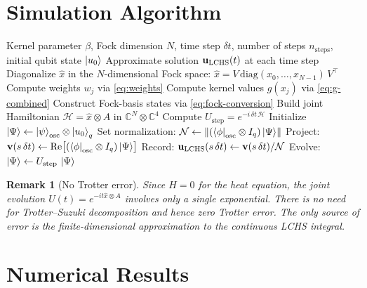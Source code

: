 \documentclass[11pt]{article}
\newtheorem{remark}{Remark}
\begin{document}
\section{Simulation Algorithm}

\begin{algorithm}[h]
\caption{CV-DV LCHS for the 1D Heat Equation}
\label{alg:lchs}
\begin{algorithmic}[1]
\Require Kernel parameter $\beta$, Fock dimension $N$, time step $\delta t$,
         number of steps $n_{\mathrm{steps}}$, initial qubit state $\ket{u_0}$
\Ensure Approximate solution $\vb{u}_{\mathrm{LCHS}}(t)$ at each time step
\State Diagonalize $\hat{x}$ in the $N$-dimensional Fock space:
       $\hat{x} = V\,\mathrm{diag}(x_0,\ldots,x_{N-1})\,V^\top$
\State Compute weights $w_j$ via \cref{eq:weights}
\State Compute kernel values $g(x_j)$ via \cref{eq:g-combined}
\State Construct Fock-basis states via \cref{eq:fock-conversion}
\State Build joint Hamiltonian $\mathcal{H} = \hat{x}\otimes A$ in
       $\mathbb{C}^N \otimes \mathbb{C}^4$
\State Compute $U_{\mathrm{step}} = e^{-i\,\delta t\,\mathcal{H}}$
\State Initialize $\ket{\Psi} \gets \ket{\psi}_{\mathrm{osc}}\otimes\ket{u_0}_q$
\State Set normalization: $\mathcal{N} \gets
       \norm{(\bra{\phi}_{\mathrm{osc}}\otimes I_q)\ket{\Psi}}$
  \State Project: $\vb{v}(s\,\delta t) \gets
         \mathrm{Re}\bigl[(\bra{\phi}_{\mathrm{osc}}\otimes I_q)\ket{\Psi}\bigr]$
  \State Record: $\vb{u}_{\mathrm{LCHS}}(s\,\delta t) \gets \vb{v}(s\,\delta t)/\mathcal{N}$
  \State Evolve: $\ket{\Psi} \gets U_{\mathrm{step}}\,\ket{\Psi}$
\EndFor
\end{algorithmic}
\end{algorithm}

\begin{remark}[No Trotter error]
Since $H = 0$ for the heat equation, the joint evolution
$U(t) = e^{-it\hat{x}\otimes A}$ involves only a single exponential.
There is no need for Trotter--Suzuki decomposition and hence
\emph{zero Trotter error}.  The only source of error is the finite-dimensional
approximation to the continuous LCHS integral.
\end{remark}

\section{Numerical Results}
\end{document}
